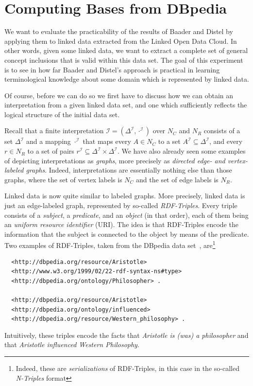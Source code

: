 \section{Computing Bases from DBpedia}
\label{sec:computing-bases-from}

We want to evaluate the practicability of the results of Baader and Distel by applying
them to linked data extracted from the Linked Open Data Cloud.  In other words, given some
linked data, we want to extract a complete set of general concept inclusions that is valid
within this data set.  The goal of this experiment is to see in how far Baader and
Distel's approach is practical in learning terminological knowledge about some domain
which is represented by linked data.

Of course, before we can do so we first have to discuss how we can obtain an
interpretation from a given linked data set, and one which sufficiently reflects the
logical structure of the initial data set.

Recall that a finite interpretation $\mathcal{I} = (\Delta^{\mathcal{I}},
\cdot^{\mathcal{I}})$ over $N_C$ and $N_R$ consists of a set $\Delta^{\mathcal{I}}$ and a
mapping $\cdot^{\mathcal{I}}$ that maps every $A \in N_C$ to a set $A^{\mathcal{I}}
\subseteq \Delta^{\mathcal{I}}$, and every $r \in N_R$ to a set of pairs $r^{\mathcal{I}}
\subseteq \Delta^{\mathcal{I}} \times \Delta^{\mathcal{I}}$.  We have also already seen
some examples of depicting interpretations as \emph{graphs}, more precisely as
\emph{directed edge- and vertex-labeled graphs}.  Indeed, interpretations are essentially
nothing else than those graphs, where the set of vertex labels is $N_C$ and the set of
edge labels is $N_R$.

Linked data is now quite similar to labeled graphs.  More precisely, linked data is just
an edge-labeled graph, represented by so-called \emph{RDF-Triples}.  Every triple consists
of a \emph{subject}, a \emph{predicate}, and an \emph{object} (in that order), each of
them being an \emph{uniform resource identifier} (URI).  The idea is that RDF-Triples
encode the information that the subject is connected to the object by means of the
predicate.  Two examples of RDF-Triples, taken from the DBpedia data set~\cite{DBpedia},
are\footnote{Indeed, these are \emph{serializations} of RDF-Triples, in this case in the
  so-called \emph{N-Triples} format}
\begin{verbatim}
  <http://dbpedia.org/resource/Aristotle>
  <http://www.w3.org/1999/02/22-rdf-syntax-ns#type>
  <http://dbpedia.org/ontology/Philosopher> .

  <http://dbpedia.org/resource/Aristotle>
  <http://dbpedia.org/ontology/influenced>
  <http://dbpedia.org/resource/Western_philosophy> .
\end{verbatim}
Intuitively, these triples encode the facts that \emph{Aristotle is (was) a philosopher}
and that \emph{Aristotle influenced Western Philosophy}.

